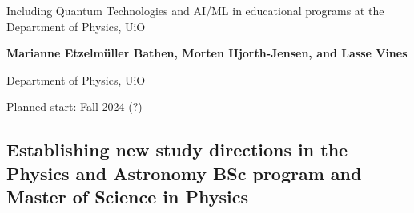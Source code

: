 \documentclass[%
oneside,                 %
final,                   %
10pt]{article}
\begin{document}

\newcommand{\exercisesection}[1]{\subsection*{#1}}






\thispagestyle{empty}

\begin{center}
{\LARGE\bf
\begin{spacing}{1.25}
Including Quantum Technologies and AI/ML in educational programs at the Department of Physics, UiO
\end{spacing}
}
\end{center}


\begin{center}
{\bf Marianne Etzelm\"uller Bathen, Morten Hjorth-Jensen, and Lasse Vines}
\end{center}

    \begin{center}
\centerline{{\small Department of Physics, UiO}}
\end{center}
    


\begin{center}
Planned start: Fall 2024 (?)
\end{center}

\vspace{1cm}


\subsection*{Establishing new study directions in the Physics and Astronomy BSc program and Master of Science in Physics}


\end{document}
